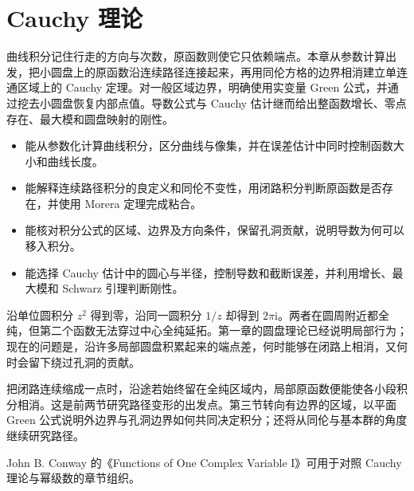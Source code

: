\chapter{Cauchy 理论}
\label{b3:ch:02}
\begin{chapterabstract}
曲线积分记住行走的方向与次数，原函数则使它只依赖端点。本章从参数计算出发，把小圆盘上的原函数沿连续路径连接起来，再用同伦方格的边界相消建立单连通区域上的 Cauchy 定理。对一般区域边界，明确使用实变量 Green 公式，并通过挖去小圆盘恢复内部点值。导数公式与 Cauchy 估计继而给出整函数增长、零点存在、最大模和圆盘映射的刚性。
\end{chapterabstract}

\begin{learninggoals}
\begin{itemize}
\item\label{b3:item:02-goal-1}能从参数化计算曲线积分，区分曲线与像集，并在误差估计中同时控制函数大小和曲线长度。
\item\label{b3:item:02-goal-2}能解释连续路径积分的良定义和同伦不变性，用闭路积分判断原函数是否存在，并使用 Morera 定理完成粘合。
\item\label{b3:item:02-goal-3}能核对积分公式的区域、边界及方向条件，保留孔洞贡献，说明导数为何可以移入积分。
\item\label{b3:item:02-goal-4}能选择 Cauchy 估计中的圆心与半径，控制导数和截断误差，并利用增长、最大模和 Schwarz 引理判断刚性。
\end{itemize}
\end{learninggoals}

沿单位圆积分 \(z^2\) 得到零，沿同一圆积分 \(1/z\) 却得到 \(2\pi\mathrm{i}\)。两者在圆周附近都全纯，但第二个函数无法穿过中心全纯延拓。第一章的圆盘理论已经说明局部行为；现在的问题是，沿许多局部圆盘积累起来的端点差，何时能够在闭路上相消，又何时会留下绕过孔洞的贡献。

\ProseParagraphBreak

把闭路连续缩成一点时，沿途若始终留在全纯区域内，局部原函数便能使各小段积分相消。这是前两节研究路径变形的出发点。第三节转向有边界的区域，以平面 Green 公式说明外边界与孔洞边界如何共同决定积分；还将从同伦与基本群的角度继续研究路径。

\ProseParagraphBreak

John B. Conway 的《Functions of One Complex Variable I》\cite{Conway1978Functions}可用于对照 Cauchy 理论与幂级数的章节组织。






